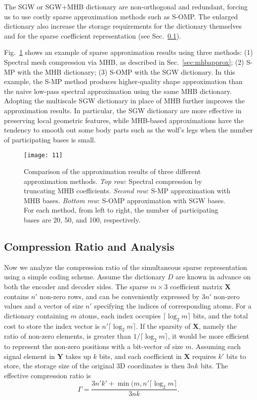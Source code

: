 The SGW or SGW+MHB dictionary are non-orthogonal and redundant,
forcing us to use costly sparse approximation methods such as S-OMP.
The enlarged dictionary also increase the storage requirements for the
dictionary themselves and for the sparse coefficient representation
(see Sec.~\ref{sec:compratio}).

Fig.~\ref{fig:wolf} shows an example of sparse approximation results
using three methods: (1) Spectral mesh compression via MHB, as
described in Sec.~\ref{sec:mhbapprox}; (2) S-MP with the MHB
dictionary; (3) S-OMP with the SGW dictionary. In this example, the
S-MP method produces higher-quality shape approximation than the naive
low-pass spectral approximation using the same MHB dictionary.
Adopting the multiscale SGW dictionary in place of MHB further
improves the approximation results. In particular, the SGW dictionary
are more effective in preserving local geometric features, while
MHB-based approximations have the tendency to smooth out some body
parts such as the wolf's legs when the number of participating bases
is small.

\begin{figure}
    \centering
    \texttt{[image: 11]}
    \caption[Comparison of three approximation methods.]
    {Comparison of the approximation results of three
      different approximation methods. \emph{Top row}: Spectral
      compression by truncating MHB coefficients. \emph{Second row}:
      S-MP approximation with MHB bases. \emph{Bottom row}: S-OMP
      approximation with SGW bases. For each method, from left to
      right, the number of participating bases are 20, 50, and 100,
      respectively.}
    \label{fig:wolf}
\end{figure}

\subsection{Compression Ratio and Analysis}
\label{sec:compratio}

Now we analyze the compression ratio of the simultaneous sparse
representation using a simple coding scheme. Assume the dictionary $D$
are known in advance on both the encoder and decoder sides. The sparse
$m\times 3$ coefficient matrix $\mathbf{X}$ contains $n'$ non-zero
rows, and can be conveniently expressed by $3n'$ non-zero values and a
vector of size $n'$ specifying the indices of corresponding atoms. For
a dictionary containing $m$ atoms, each index occupies $\lceil\log_2
m\rceil$ bits, and the total cost to store the index vector is
$n'\lceil\log_2 m\rceil$. If the sparsity of $\mathbf{X}$, namely the
ratio of non-zero elements, is greater than $1/\lceil\log_2 m\rceil$,
it would be more efficient to represent the non-zero positions with a
bit-vector of size $m$. Assuming each signal element in $\mathbf{Y}$
takes up $k$ bits, and each coefficient in $\mathbf{X}$ requires $k'$
bits to store, the storage size of the original 3D coordinates is then
$3nk$ bits. The effective compression ratio is
\begin{equation}\label{eq:compress}
\Gamma = \frac{3n'k' + \min (m, n'\lceil\log_2 m\rceil}{3nk}.
\end{equation}

